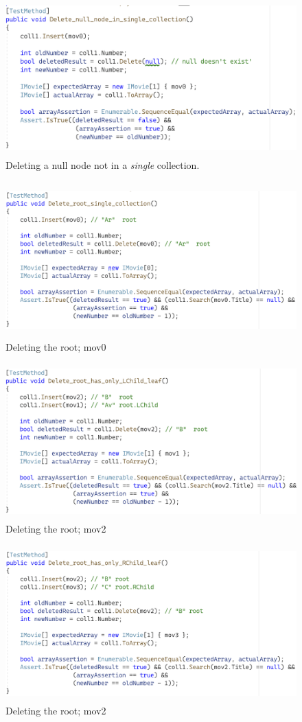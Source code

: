 \documentclass[a4paper]{article}
\begin{document}
\begin{figure}[H]
    \includegraphics[height=6cm]{data/Delete_null_node_in_single_collection.png}
    \caption{Deleting a null node not in a \textit{single} collection.}
\end{figure}
\begin{figure}[H]
    \includegraphics[height=6cm]{data/Delete_root_single_collection.png}
    \caption{Deleting the root; mov0}
\end{figure}
\begin{figure}[H]
    \includegraphics[height=6cm]{data/Delete_root_has_only_LChild_leaf.png}
    \caption{Deleting the root; mov2}
\end{figure}
\begin{figure}[H]
    \includegraphics[height=6cm]{data/Delete_root_has_only_RChild_leaf.png}
    \caption{Deleting the root; mov2}
\end{figure}
\end{document}
